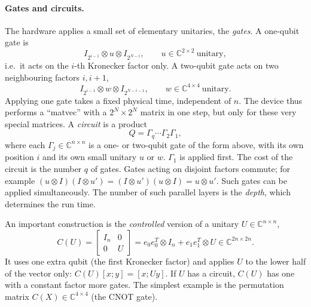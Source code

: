 \documentclass[11pt,a4paper]{article}
\newcommand{\C}{\mathbb{C}}
\begin{document}
\paragraph{Gates and circuits.} The hardware applies a small set of
elementary unitaries, the \emph{gates}. A one-qubit gate is
\[
  I_{2^{i-1}}\otimes u\otimes I_{2^{N-i}},\qquad u\in\C^{2\times2}\ \text{unitary},
\]
i.e.\ it acts on the $i$-th Kronecker factor only. A two-qubit gate
acts on two neighbouring factors $i,i+1$,
\[
  I_{2^{i-1}}\otimes w\otimes I_{2^{N-i-1}},\qquad w\in\C^{4\times4}\ \text{unitary}.
\]
Applying one gate takes a fixed physical time, independent of $n$. The
device thus performs a ``matvec'' with a $2^N\times 2^N$ matrix in one
step, but only for these very special matrices. A \emph{circuit} is a
product
\[
  Q=\Gamma_q\cdots\Gamma_2\Gamma_1,
\]
where each $\Gamma_j\in\C^{n\times n}$ is a one- or two-qubit gate of the form
above, with its own position $i$ and its own small unitary $u$ or $w$.
$\Gamma_1$ is applied first. The cost of the circuit is the number $q$ of
gates. Gates acting on disjoint factors commute; for example
$(u\otimes I)(I\otimes u')=(I\otimes u')(u\otimes I)=u\otimes u'$. Such gates can
be applied simultaneously. The number of such parallel layers is the \emph{depth},
which determines the run time.

An important construction is the \emph{controlled} version of a unitary
$U\in\C^{n\times n}$,
\begin{equation}\label{eq:controlled}
  C(U) = \begin{bmatrix} I_n & 0\\ 0 & U\end{bmatrix}
  = e_0e_0^T\otimes I_n + e_1e_1^T\otimes U \in \C^{2n\times 2n}.
\end{equation}
It uses one extra qubit (the first Kronecker factor) and applies $U$ to
the lower half of the vector only: $C(U)[x;y]=[x;Uy]$. If $U$ has a circuit, $C(U)$ has one
with a constant factor more gates. The simplest example is the
permutation matrix $C(X)\in\C^{4\times4}$ (the CNOT gate).
\end{document}
